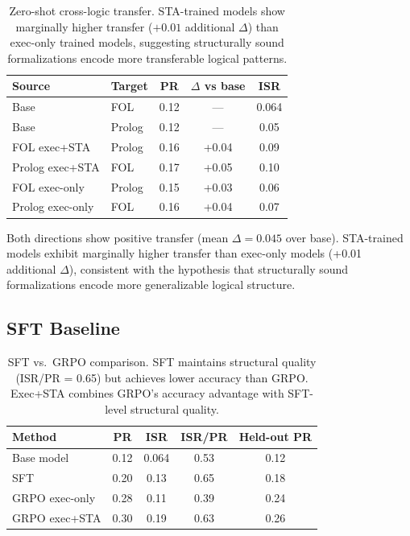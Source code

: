\documentclass[11pt,a4paper]{article}
\begin{document}
\begin{table}[t]
\centering
\small
\begin{tabular}{llccc}
\toprule
\textbf{Source} & \textbf{Target} & \textbf{PR} & $\Delta$ \textbf{vs base} & \textbf{ISR} \\
\midrule
Base & FOL & 0.12 & --- & 0.064 \\
Base & Prolog & 0.12 & --- & 0.05 \\
FOL exec+STA & Prolog & 0.16 & +0.04 & 0.09 \\
Prolog exec+STA & FOL & 0.17 & +0.05 & 0.10 \\
FOL exec-only & Prolog & 0.15 & +0.03 & 0.06 \\
Prolog exec-only & FOL & 0.16 & +0.04 & 0.07 \\
\bottomrule
\end{tabular}
\caption{Zero-shot cross-logic transfer. STA-trained models show marginally higher transfer ($+0.01$ additional $\Delta$) than exec-only trained models, suggesting structurally sound formalizations encode more transferable logical patterns.}
\label{tab:cross_transfer}
\end{table}

Both directions show positive transfer (mean $\Delta = 0.045$ over base). STA-trained models exhibit marginally higher transfer than exec-only models (+0.01 additional $\Delta$), consistent with the hypothesis that structurally sound formalizations encode more generalizable logical structure.

\subsection{SFT Baseline}
\label{sec:sft}

\begin{table}[t]
\centering
\small
\begin{tabular}{lcccc}
\toprule
\textbf{Method} & \textbf{PR} & \textbf{ISR} & \textbf{ISR/PR} & \textbf{Held-out PR} \\
\midrule
Base model & 0.12 & 0.064 & 0.53 & 0.12 \\
SFT & 0.20 & 0.13 & 0.65 & 0.18 \\
GRPO exec-only & 0.28 & 0.11 & 0.39 & 0.24 \\
GRPO exec+STA & 0.30 & 0.19 & 0.63 & 0.26 \\
\bottomrule
\end{tabular}
\caption{SFT vs.\ GRPO comparison. SFT maintains structural quality (ISR/PR = 0.65) but achieves lower accuracy than GRPO. Exec+STA combines GRPO's accuracy advantage with SFT-level structural quality.}
\label{tab:sft}
\end{table}
\end{document}
